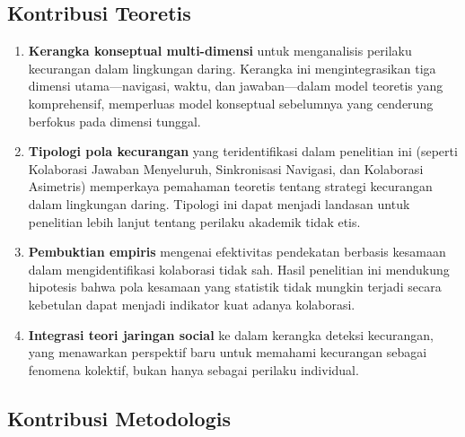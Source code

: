 \subsection{Kontribusi Teoretis}

\begin{enumerate}
    \item \textbf{Kerangka konseptual multi-dimensi} untuk menganalisis perilaku kecurangan dalam lingkungan daring. Kerangka ini mengintegrasikan tiga dimensi utama—navigasi, waktu, dan jawaban—dalam model teoretis yang komprehensif, memperluas model konseptual sebelumnya yang cenderung berfokus pada dimensi tunggal.
    
    \item \textbf{Tipologi pola kecurangan} yang teridentifikasi dalam penelitian ini (seperti Kolaborasi Jawaban Menyeluruh, Sinkronisasi Navigasi, dan Kolaborasi Asimetris) memperkaya pemahaman teoretis tentang strategi kecurangan dalam lingkungan daring. Tipologi ini dapat menjadi landasan untuk penelitian lebih lanjut tentang perilaku akademik tidak etis.
    
    \item \textbf{Pembuktian empiris} mengenai efektivitas pendekatan berbasis kesamaan dalam mengidentifikasi kolaborasi tidak sah. Hasil penelitian ini mendukung hipotesis bahwa pola kesamaan yang statistik tidak mungkin terjadi secara kebetulan dapat menjadi indikator kuat adanya kolaborasi.
    
    \item \textbf{Integrasi teori jaringan social} ke dalam kerangka deteksi kecurangan, yang menawarkan perspektif baru untuk memahami kecurangan sebagai fenomena kolektif, bukan hanya sebagai perilaku individual.
\end{enumerate}

\subsection{Kontribusi Metodologis}

